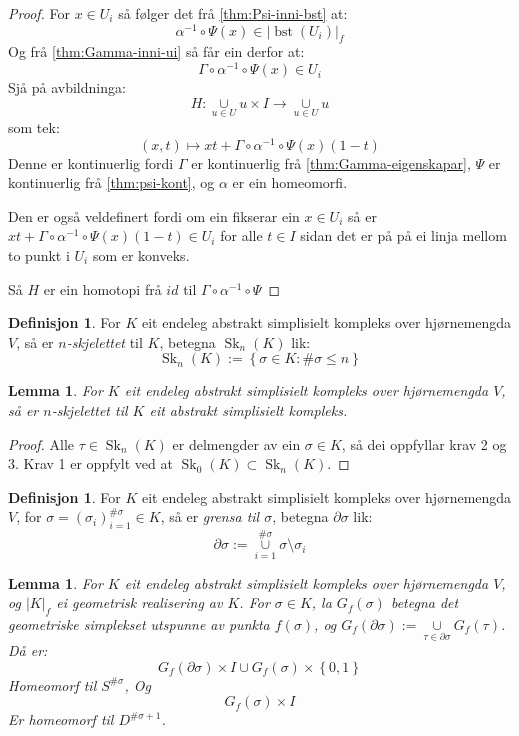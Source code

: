 \documentclass[a4paper, 12pt, norsk]{article}
\theoremstyle{plain}
\newtheorem{lemma}[theorem]{Lemma}
\theoremstyle{definition}
\newtheorem{definition}[theorem]{Definisjon}
\newcommand{\union}{ \mathop{\cup}\limits }
\newcommand{\gr}[1]{ \lvert #1 \rvert } %
\newcommand{\set}[1]{ \left \{ #1 \right \} } %
\newcommand{\tuple}[1]{ \left( #1 \right) } %
\DeclareMathOperator{\bst}{bst}
\DeclareMathOperator{\Sk}{Sk}
\begin{document}
\begin{proof}
	For \( x \in U_i \) så følger det frå \autoref{thm:Psi-inni-bst} at:
	\[
		\alpha^{-1} \circ \Psi(x) \in \gr{\bst(U_i)}_f
	\]
	Og frå \autoref{thm:Gamma-inni-ui} så får ein derfor at:
	\[
		\Gamma \circ \alpha^{-1} \circ \Psi(x) \in U_i
	\]
	Sjå på avbildninga:
	\[
		H: \union_{u \in U} u \times I \to \union_{u \in U} u
	\]
	som tek:
	\[
		\tuple{x, t} \mapsto xt + \Gamma \circ \alpha^{-1} \circ \Psi(x)(1-t)
	\]
	Denne er kontinuerlig fordi \( \Gamma \) er kontinuerlig frå \autoref{thm:Gamma-eigenskapar}, \( \Psi \) er kontinuerlig frå \autoref{thm:psi-kont}, og \( \alpha \) er ein homeomorfi.
	
	Den er også veldefinert fordi om ein fikserar ein \( x \in U_i \) så er \( xt + \Gamma \circ \alpha^{-1} \circ \Psi(x)(1-t) \in U_i \) for alle \( t \in I \) sidan det er på på ei linja mellom to punkt i \( U_i \) som er konveks.

	Så \( H \) er ein homotopi frå \( id \) til \( \Gamma \circ \alpha^{-1} \circ \Psi \)
\end{proof}

\begin{definition}
	For \( K \) eit endeleg abstrakt simplisielt kompleks over hjørnemengda \( V \), så er \emph{\( n \)-skjelettet} til \( K \), betegna \( \Sk_n(K) \) lik:
	\[
		\Sk_n(K) := \set{\sigma \in K : \#\sigma \leq n}
	\]
\end{definition}

\begin{lemma}
	For \( K \) eit endeleg abstrakt simplisielt kompleks over hjørnemengda \( V \), så er \( n \)-skjelettet til \( K \) eit abstrakt simplisielt kompleks.
\end{lemma}

\begin{proof}
	Alle \( \tau \in \Sk_n(K) \) er delmengder av ein \( \sigma \in K \), så dei oppfyllar krav 2 og 3. Krav 1 er oppfylt ved at \( \Sk_0(K) \subset \Sk_n(K) \).
\end{proof}

\begin{definition}
	For \( K \) eit endeleg abstrakt simplisielt kompleks over hjørnemengda \( V \), for \( \sigma = \tuple{\sigma_i}_{i=1}^{\#\sigma} \in K \), så er \emph{grensa til \( \sigma \)}, betegna \( \partial\sigma \) lik:
	\[
		\partial\sigma := \union_{i = 1}^{\#\sigma} \sigma \setminus \sigma_i 
	\]
\end{definition}

\begin{lemma} \label{thm:utvida-funk}
	For \( K \) eit endeleg abstrakt simplisielt kompleks over hjørnemengda \( V \), og \( \gr{K}_f \) ei geometrisk realisering av \( K \). For \( \sigma \in K \), la \( G_f(\sigma) \) betegna det geometriske simplekset utspunne av punkta \( f(\sigma) \), og \( G_f(\partial\sigma) := \union_{\tau \in \partial\sigma} G_f(\tau) \). Då er:
	\[
		G_f(\partial\sigma) \times I \union G_f(\sigma) \times \set{0, 1}
	\] 
	Homeomorf til \( S^{\#\sigma} \), Og
	\[
		G_f(\sigma) \times I
	\] 
	Er homeomorf til \( D^{\#\sigma+1} \).
\end{lemma}
\end{document}
